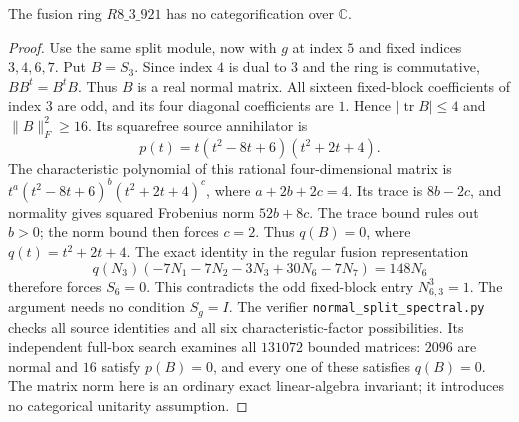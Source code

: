 \begin{theorem}
The fusion ring $R8\_3\_921$ has no categorification over $\mathbb C$.
\end{theorem}
\begin{proof}
Use the same split module, now with $g$ at index $5$ and fixed indices
$3,4,6,7$.  Put $B=S_3$.  Since index $4$ is dual to $3$ and the ring
is commutative, $BB^t=B^tB$.  Thus $B$ is a real normal matrix.
All sixteen fixed-block coefficients of index $3$ are odd, and its four
diagonal coefficients are $1$.  Hence
$|\operatorname{tr}B|\leq4$ and $\|B\|_F^2\geq16$.
Its squarefree source annihilator is
\[
 p(t)=t(t^2-8t+6)(t^2+2t+4).
\]
The characteristic polynomial of this rational four-dimensional matrix
is $t^a(t^2-8t+6)^b(t^2+2t+4)^c$, where
$a+2b+2c=4$.  Its trace is $8b-2c$, and normality gives squared
Frobenius norm $52b+8c$.  The trace bound rules out $b>0$; the norm
bound then forces $c=2$.  Thus $q(B)=0$, where $q(t)=t^2+2t+4$.
The exact identity in the regular fusion representation
\[
 q(N_3)(-7N_1-7N_2-3N_3+30N_6-7N_7)=148N_6
\]
therefore forces $S_6=0$.  This contradicts the odd fixed-block entry
$N_{6,3}^{3}=1$.  The argument needs no condition $S_g=I$.
The verifier \texttt{normal\_split\_spectral.py} checks all source
identities and all six characteristic-factor possibilities.  Its
independent full-box search examines all $131072$ bounded matrices:
$2096$ are normal and $16$ satisfy $p(B)=0$, and every one of these
satisfies $q(B)=0$.  The matrix norm here is an ordinary exact
linear-algebra invariant; it introduces no categorical unitarity
assumption.
\end{proof}
